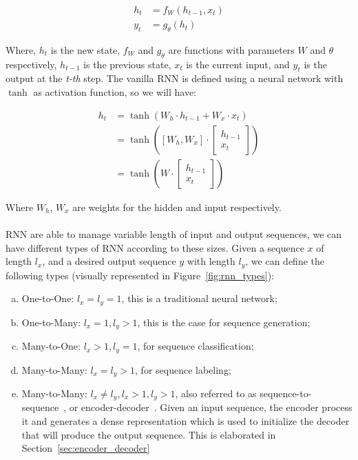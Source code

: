 \begin{equation}
\begin{split}
    h_t & = f_W(h_{t-1}, x_t) \\
    y_t & = g_{\theta}(h_t)
\end{split}
\label{eq:generic_rnn}
\end{equation}

Where, $h_t$ is the new state, $f_W$ and $g_\theta$ are functions with parameters $W$ and $\theta$ respectively, $h_{t-1}$ is the previous state, $x_t$ is the current input, and $y_t$ is the output at the \textit{t-th} step.
The vanilla RNN is defined using a neural network with $\tanh$ as activation function, so we will have:

\begin{equation}
\begin{split}
    h_t & = \tanh\left(W_h \cdot h_{t-1} + W_x \cdot x_t\right)\\
        & = \tanh\left([W_h, W_x] \cdot \begin{bmatrix}
           h_{t-1} \\
           x_t
         \end{bmatrix}\right)\\
         & = \tanh\left(W \cdot \begin{bmatrix}
           h_{t-1} \\
           x_t
         \end{bmatrix}\right)
\end{split}
\end{equation}

Where $W_h$, $W_x$ are weights for the hidden and input respectively. 

\paragraph{}
RNN are able to manage variable length of input and output sequences, we can have different types of RNN according to these sizes. Given a sequence $x$ of length $l_x$, and a desired output sequence $y$ with length $l_y$, we can define the following types (visually represented in Figure~\ref{fig:rnn_types}):

\begin{enumerate}[a), noitemsep]
    \item One-to-One: $l_x = l_y = 1$, this is a traditional neural network;
    \item One-to-Many: $l_x = 1, l_y > 1$, this is the case for sequence generation;
    \item Many-to-One: $l_x > 1, l_y = 1$, for sequence classification;
    \item Many-to-Many: $l_x = l_y > 1$, for sequence labeling;
    \item Many-to-Many: $l_x \neq l_y, l_x > 1, l_y > 1$, also referred to as sequence-to-sequence~\citep{sutskever2014sequence}, or encoder-decoder~\citep{cho-etal-2014-learning}. Given an input sequence, the encoder process it and generates a dense representation which is used to initialize the decoder that will produce the output sequence. This is elaborated in Section~\ref{sec:encoder_decoder}
\end{enumerate}


